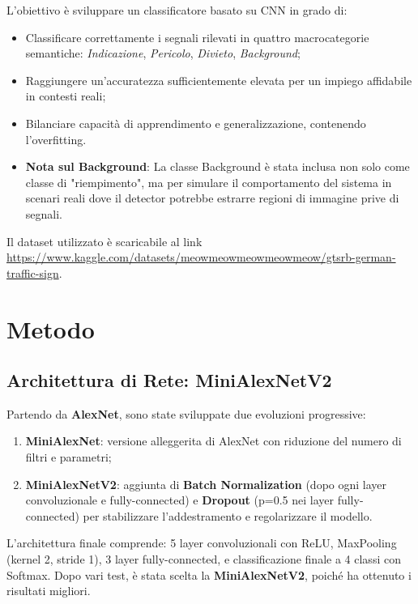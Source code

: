 \documentclass[openany,italian,12pt]{article}
\begin{document}
L'obiettivo è sviluppare un classificatore basato su CNN in grado di:
\begin{itemize}
    \item Classificare correttamente i segnali rilevati in quattro macrocategorie semantiche: \textit{Indicazione}, \textit{Pericolo}, \textit{Divieto}, \textit{Background};
    \item Raggiungere un'accuratezza sufficientemente elevata per un impiego affidabile in contesti reali;
    \item Bilanciare capacità di apprendimento e generalizzazione, contenendo l'overfitting.
    \item \textbf{Nota sul Background}: La classe Background è stata inclusa non solo come classe di "riempimento", ma per simulare il comportamento del sistema in scenari reali dove il detector potrebbe estrarre regioni di immagine prive di segnali.
\end{itemize}

Il dataset utilizzato è scaricabile al link \url{https://www.kaggle.com/datasets/meowmeowmeowmeowmeow/gtsrb-german-traffic-sign}.

\section*{Metodo}

\subsection*{Architettura di Rete: MiniAlexNetV2}
Partendo da \textbf{AlexNet}, sono state sviluppate due evoluzioni progressive:
\begin{enumerate}
    \item \textbf{MiniAlexNet}: versione alleggerita di AlexNet con riduzione del numero di filtri e parametri;
    \item \textbf{MiniAlexNetV2}: aggiunta di \textbf{Batch Normalization} (dopo ogni layer convoluzionale e fully-connected) e \textbf{Dropout} (p=0.5 nei layer fully-connected) per stabilizzare l'addestramento e regolarizzare il modello.
\end{enumerate}
L'architettura finale comprende: 5 layer convoluzionali con ReLU, MaxPooling (kernel 2, stride 1), 3 layer fully-connected, e classificazione finale a 4 classi con Softmax.
Dopo vari test, è stata scelta la \textbf{MiniAlexNetV2}, poiché ha ottenuto i risultati migliori.
\end{document}
